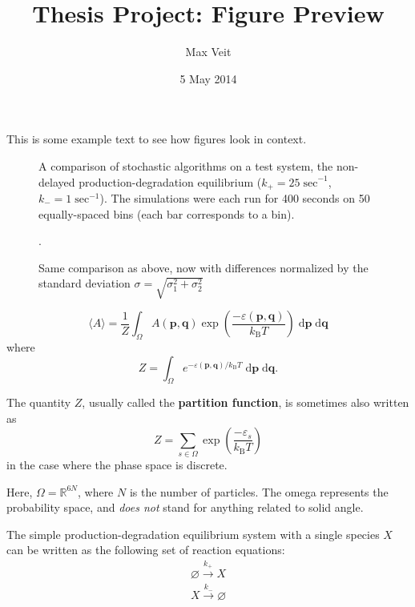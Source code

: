 \documentclass[english,letterpaper,12pt]{article}
\newcommand{\unit}[1]{\;\mathrm{#1}}
\newcommand{\dee}{\;\mathrm{d}}
\renewcommand{\vec}[1]{\ensuremath{\mathbf{#1}}}
\newcommand{\kB}{\ensuremath{k_\mathrm{B}}}
\begin{document}
\title{Thesis Project: Figure Preview}
\author{Max Veit}
\date{5 May 2014}

\maketitle

\begin{doublespacing}

This is some example text to see how figures look in context.

\begin{figure}[ht]
    \centering
     
    \caption{A comparison of stochastic algorithms on a test system, the non-delayed production-degradation equilibrium (${k_+=25\unit{sec}}^{-1}$, ${k_- = 1\unit{sec}^{-1}}$). The simulations were each run for 400 seconds on 50 equally-spaced bins (each bar corresponds to a bin).}
    \label{fig:gaussian-verification}
\end{figure}

\begin{figure}[ht]
    \centering
     
    \caption{Same comparison as above, now with differences normalized by the standard deviation $\sigma = \sqrt{\sigma_1^2 + \sigma_2^2}$}.
    \label{fig:prod-deg-chi}
\end{figure}

\begin{equation}
    \langle A \rangle = \frac{1}{Z} \int_\Omega A(\vec{p}, \vec{q}) \exp\left(\frac{-\varepsilon(\vec{p}, \vec{q})}{\kB T}\right) \dee \vec{p} \dee \vec{q}
\end{equation}
where
\begin{equation}
    Z = \int_\Omega e^{-\varepsilon(\vec{p}, \vec{q}) / \kB T}\dee \vec{p} \dee \vec{q}.
\end{equation}

The quantity $Z$, usually called the \textbf{partition function}, is sometimes also written as
\begin{equation}
    Z = \sum_{s \in \Omega} \exp\left( \frac{-\varepsilon_s}{\kB T} \right)
    \label{eq:partfun-discrete}
\end{equation}
in the case where the phase space is discrete.

Here, $\Omega = \mathbb{R}^{6N}$, where $N$ is the number of particles. The omega represents the probability space, and \emph{does not} stand for anything related to solid angle.

The simple production-degradation equilibrium system with a single species $X$ can be written as the following set of reaction equations:
\begin{align}
    \varnothing \xrightarrow{k_+} X \\
    X \xrightarrow {k_-} \varnothing
    \label{eq:prod-deg-rxn}
\end{align}


\end{doublespacing}
\end{document}
